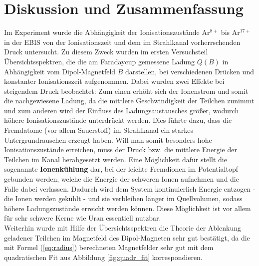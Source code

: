 \section{Diskussion und Zusammenfassung}
	Im Experiment wurde die Abhängigkeit der Ionisationszustände Ar$^{8+}$ bis Ar$^{17+}$ in der EBIS von der Ionisationszeit und dem im Strahlkanal vorherrschenden Druck untersucht. Zu diesem Zweck wurden im ersten Versuchsteil Übersichtsspektren, die die am Faradaycup gemessene Ladung $Q(B)$ in Abhängigkeit vom Dipol-Magnetfeld $B$ darstellen, bei verschiedenen Drücken und konstanter Ionisationszeit aufgenommen. Dabei wurden zwei Effekte bei steigendem Druck beobachtet: Zum einen erhöht sich der Ionenstrom und somit die nachgewiesene Ladung, da die mittlere Geschwindigkeit der Teilchen zunimmt und zum anderen wird der Einfluss des Ladungsaustausches größer, wodurch höhere Ionisationszustände unterdrückt werden. Dies führte dazu, dass die Fremdatome (vor allem Sauerstoff) im Strahlkanal ein starkes Untergrundrauschen erzeugt haben. Will man somit besonders hohe Ionisationszustände erreichen, muss der Druck bzw. die mittlere Energie der Teilchen im Kanal herabgesetzt werden. Eine Möglichkeit dafür stellt die sogenannte \textbf{Ionenkühlung} dar, bei der leichte Fremdionen im Potentialtopf gebunden werden, welche die Energie der schweren Ionen aufnehmen und die Falle dabei verlassen. Dadurch wird dem System kontinuierlich Energie entzogen - die Ionen werden gekühlt - und sie verbleiben länger im Quellvolumen, sodass höhere Ladungszustände erreicht werden können. Diese Möglichkeit ist vor allem für sehr schwere Kerne wie Uran essentiell nutzbar. \cite{PA}\\
	Weiterhin wurde mit Hilfe der Übersichtsspektren die Theorie der Ablenkung geladener Teilchen im Magnetfeld des Dipol-Magneten sehr gut bestätigt, da die mit Formel (\ref{eq:radius}) berechneten Magnetfelder sehr gut mit dem quadratischen Fit aus Abbildung \ref{fig:quadr_fit} korrespondieren.\\
	
